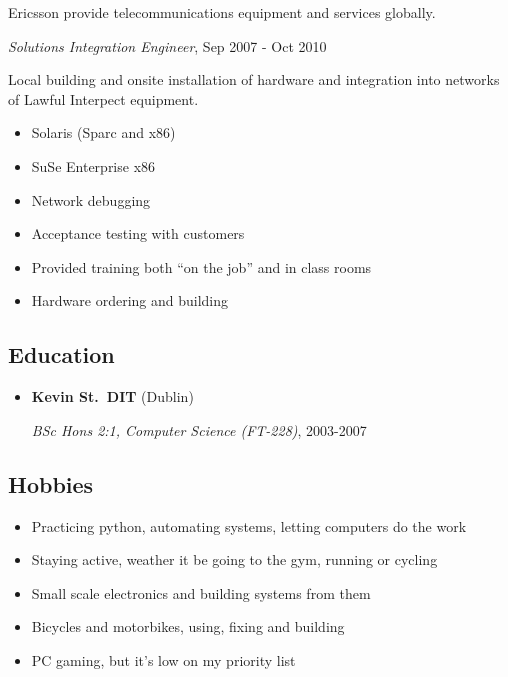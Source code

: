 \documentclass[]{article}
\providecommand{\tightlist}{%
  \setlength{\itemsep}{0pt}\setlength{\parskip}{0pt}}
\begin{document}
\begin{itemize}
  Ericsson provide telecommunications equipment and services globally.

  \emph{Solutions Integration Engineer}, Sep 2007 - Oct 2010

  Local building and onsite installation of hardware and integration
  into networks of Lawful Interpect equipment.

  \begin{itemize}
  \tightlist
  \item
    Solaris (Sparc and x86)
  \item
    SuSe Enterprise x86
  \item
    Network debugging
  \item
    Acceptance testing with customers
  \item
    Provided training both ``on the job'' and in class rooms
  \item
    Hardware ordering and building
  \end{itemize}
\end{itemize}

\subsection{Education}\label{education}

\begin{itemize}
\item
  \textbf{Kevin St.~DIT} (Dublin)

  \emph{BSc Hons 2:1, Computer Science (FT-228)}, 2003-2007
\end{itemize}

\subsection{Hobbies}\label{hobbies}

\begin{itemize}
\item
  Practicing python, automating systems, letting computers do the work
\item
  Staying active, weather it be going to the gym, running or cycling
\item
  Small scale electronics and building systems from them
\item
  Bicycles and motorbikes, using, fixing and building
\item
  PC gaming, but it's low on my priority list
\end{itemize}
\end{document}
